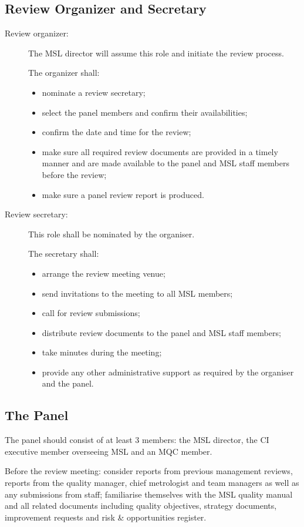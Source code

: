\subsection{Review Organizer and Secretary}
\begin{description}
\item[Review organizer: ]The MSL director will assume this role and initiate the review process.

The organizer shall: 
\begin{itemize}
\item nominate a review secretary;
\item select the panel members and confirm
their availabilities;
\item confirm the date and time for the review;
\item make sure all required review
documents are provided in a timely manner and are made available to the panel and MSL
staff members before the review;
\item   make sure a panel review report is produced.
\end{itemize}  
\item[Review secretary: ] This role shall be nominated by the organiser. 

The secretary shall: 
\begin{itemize}
\item arrange the review meeting venue;
\item send invitations to the meeting to all MSL members;
\item call for review submissions;
\item distribute review documents to the panel and MSL staff members;
\item take minutes during the meeting;
\item  provide any other administrative support as required by the organiser and the panel.
\end{itemize}   
\end{description} 

\subsection{The Panel}
The panel should consist of at least 3 members: the MSL director, the CI executive member
overseeing MSL and an MQC member.

Before the review meeting: consider reports from previous management reviews, reports
from the quality manager, chief metrologist and team managers as well as any submissions
from staff; familiarise themselves with the MSL quality manual and all related documents
including quality objectives, strategy documents, improvement requests and risk \& opportunities register.

